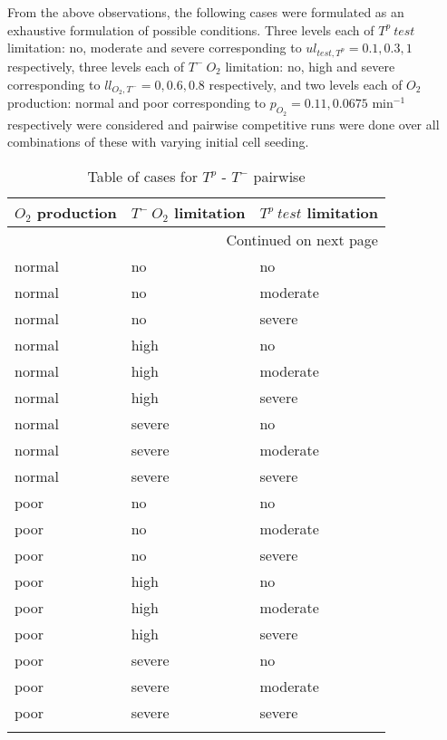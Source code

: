 From the above observations, the following cases were formulated as an exhaustive formulation of possible conditions. Three levels each of $T^p\ test$ limitation: no, moderate and severe corresponding to $ul_{test,T^p}=0.1, 0.3, 1$ respectively, three levels each of $T^-\ O_2$ limitation: no, high and severe corresponding to $ll_{O_2,T^-}=0, 0.6, 0.8$ respectively, and two levels each of $O_2$ production: normal and poor corresponding to $p_{O_2}=0.11, 0.0675$ min$^{-1}$ respectively were considered and pairwise competitive runs were done over all combinations of these with varying initial cell seeding.
\begin{longtable}[c]{|l|l|l|}

  \hline \multicolumn{1}{|c|}{\textbf{$O_2$ production}} & \multicolumn{1}{c|}{\textbf{$T^-\ O_2$ limitation}} & \multicolumn{1}{c|}{\textbf{$T^p\ test$ limitation}}\\ \hline
  \endhead

  \hline \multicolumn{3}{|r|}{{Continued on next page}} \\ \hline
  \endfoot

  \endlastfoot

  normal & no & no \\ \hline
  normal & no & moderate \\ \hline
  normal & no & severe \\ \hline
  normal & high & no \\ \hline
  normal & high & moderate \\ \hline
  normal & high & severe \\ \hline
  normal & severe & no \\ \hline
  normal & severe & moderate \\ \hline
  normal & severe & severe \\ \hline
  poor & no & no \\ \hline
  poor & no & moderate \\ \hline
  poor & no & severe \\ \hline
  poor & high & no \\ \hline
  poor & high & moderate \\ \hline
  poor & high & severe \\ \hline
  poor & severe & no \\ \hline
  poor & severe & moderate \\ \hline
  poor & severe & severe \\ \hline

  \caption{Table of cases for $T^p$ - $T^-$ pairwise}
  \label{tab_Tpro-Tneg_cases}
\end{longtable}

